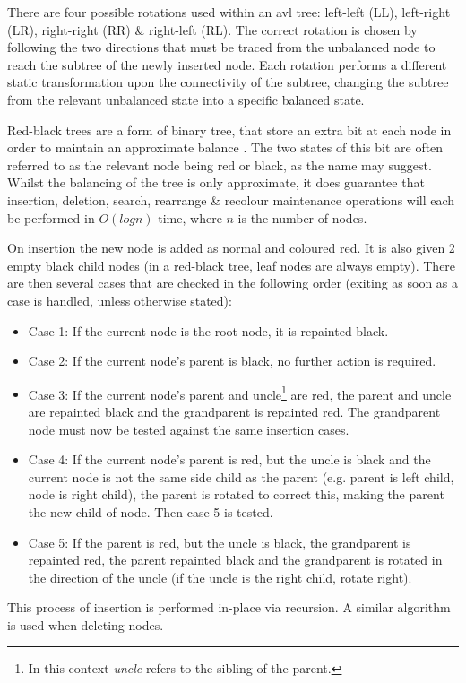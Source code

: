         There are four possible rotations used within an \gls{avl} tree: left-left (LL), left-right (LR), right-right (RR) \& right-left (RL). The correct rotation is chosen by following the two directions that must be traced from the unbalanced node to reach the subtree of the newly inserted node. Each rotation performs a different static transformation upon the connectivity of the subtree, changing the subtree from the relevant unbalanced state into a specific balanced state.
        
        Red-black trees are a form of binary tree, that store an extra bit at each node in order to maintain an approximate balance \cite{GS78}. The two states of this bit are often referred to as the relevant node being red or black, as the name may suggest. Whilst the balancing of the tree is only approximate, it does guarantee that insertion, deletion, search, rearrange \& recolour maintenance operations will each be performed in $O(log n)$ time, where $n$ is the number of nodes.
        
        On insertion the new node is added as normal and coloured red. It is also given 2 empty black child nodes (in a red-black tree, leaf nodes are always empty). There are then several cases that are checked in the following order (exiting as soon as a case is handled, unless otherwise stated):
        \begin{itemize}
          \item{Case 1: If the current node is the root node, it is repainted black.}
          \item{Case 2: If the current node's parent is black, no further action is required.}
          \item{Case 3: If the current node's parent and uncle\footnote{In this context \textit{uncle} refers to the sibling of the parent.} are red, the parent and uncle are repainted black and the grandparent is repainted red. The grandparent node must now be tested against the same insertion cases.}
          \item{Case 4: If the current node's parent is red, but the uncle is black and the current node is not the same side child as the parent (e.g. parent is left child, node is right child), the parent is rotated to correct this, making the parent the new child of node. Then case 5 is tested.}
          \item{Case 5: If the parent is red, but the uncle is black, the grandparent is repainted red, the parent repainted black and the grandparent is rotated in the direction of the uncle (if the uncle is the right child, rotate right). }
        \end{itemize}
        This process of insertion is performed in-place via recursion. A similar algorithm is used when deleting nodes.
      

